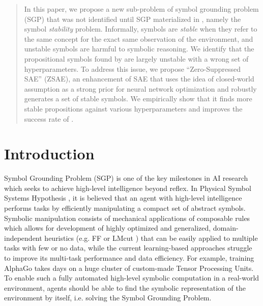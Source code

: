 \begin{abstract}
In this paper, we propose a new sub-problem of symbol grounding problem (SGP)
that was not identified until SGP materialized in \latentplanner, namely
the symbol \emph{stability} problem.  Informally, symbols are
\emph{stable} when they refer to the same concept for the exact same
observation of the environment, and unstable symbols are harmful to symbolic
reasoning.
We identify that the propositional symbols found by \latentplanner 
are largely unstable with a wrong set of hyperparameters.
% 
To address this issue, we propose ``Zero-Suppressed SAE''
(ZSAE), an enhancement of SAE that uses the idea of closed-world
assumption as a strong prior for neural network optimization 
and robustly generates a set of stable symbols.
We empirically show that it finds more stable propositions
against various hyperparameters and improves the success rate of
\latentplanner.
\end{abstract}


\section{Introduction}


Symbol Grounding Problem (SGP) \cite{harnad1990symbol,Steels2008} is one of the key milestones in AI research
which seeks to achieve high-level intelligence beyond reflex.
In Physical Symbol Systems Hypothesis \cite{newell1976computer}, it is believed that
an agent with high-level intelligence performs tasks by efficiently manipulating a compact set of abstract symbols.
% 
Symbolic manipulation consists of mechanical applications of composable rules which allows for
development of highly optimized and generalized, domain-independent heuristics (e.g. FF \cite{Hoffmann01} or LMcut \cite{Helmert2009})
that can be easily applied to multiple tasks with few or no data,
while the current learning-based approaches struggle to improve its multi-task performance and data efficiency.
For example, training AlphaGo \cite{alphago} takes days on a huge cluster of custom-made Tensor Processing Units.
% 
To enable such a fully automated high-level symbolic computation in a real-world environment,
agents should be able to find the symbolic representation of the environment by itself, i.e. solving the Symbol Grounding Problem.

